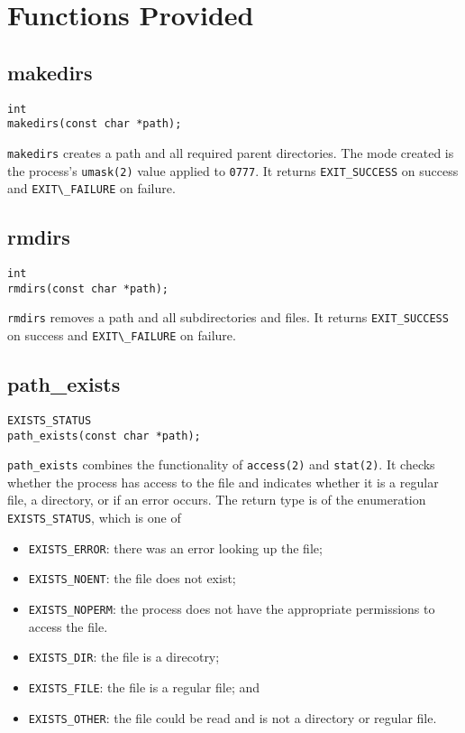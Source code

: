 \documentclass[10pt,letterpaper]{article}
\begin{document}
\section*{Functions Provided}
\subsection*{makedirs}
\begin{verbatim}
int
makedirs(const char *path);
\end{verbatim}
\verb|makedirs| creates a path and all required parent directories. The mode
created is the process's \verb|umask(2)| value applied to \verb|0777|.
It returns \verb|EXIT_SUCCESS| on success and \verb|EXIT\_FAILURE| on failure.

\subsection*{rmdirs}
\begin{verbatim}
int
rmdirs(const char *path);
\end{verbatim}
\verb|rmdirs| removes a path and all subdirectories and files.
It returns \verb|EXIT_SUCCESS| on success and \verb|EXIT\_FAILURE| on failure.

\subsection*{path\_exists}
\begin{verbatim}
EXISTS_STATUS
path_exists(const char *path);
\end{verbatim}
\verb|path_exists| combines the functionality of \verb|access(2)| and
\verb|stat(2)|. It checks whether the process has access to the file
and indicates whether it is a regular file, a directory, or if an
error occurs. The return type is of the enumeration \verb|EXISTS_STATUS|,
which is one of
\\
\begin{itemize}
  \item \verb|EXISTS_ERROR|: there was an error looking up the file;
  \item \verb|EXISTS_NOENT|: the file does not exist;
  \item \verb|EXISTS_NOPERM|: the process does not have the appropriate
  permissions to access the file.
  \item \verb|EXISTS_DIR|: the file is a direcotry;
  \item \verb|EXISTS_FILE|: the file is a regular file; and
  \item \verb|EXISTS_OTHER|: the file could be read and is not a directory
or regular file.

\end{itemize}
\end{document}
